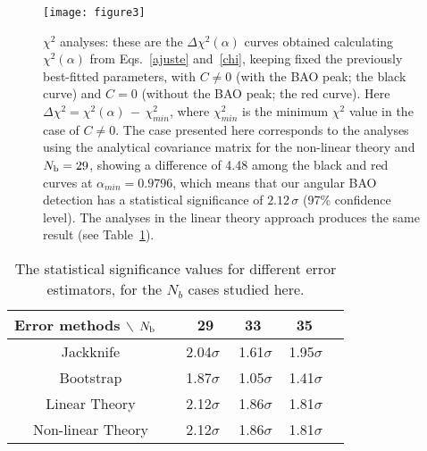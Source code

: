 \documentclass[a4paper,11pt]{article}
\begin{document}
\begin{figure*}[h!]
\centering
\texttt{[image: figure3]}
\caption{
$\chi^2$ analyses: these are the $\Delta\chi^2(\alpha)$ curves obtained calculating $\chi^2(\alpha)$ from Eqs.~\ref{ajuste} and~\ref{chi}, keeping fixed the previously best-fitted parameters, with $C \neq 0$ (with the BAO 
peak; the black curve) and $C = 0$ (without the BAO peak; the red curve).
Here $\Delta\chi^2 = \chi^2(\alpha) \,-\, \chi^2_{min}$, where $\chi^2_{min}$ is the minimum $\chi^2$ value in the case of $C \neq 0$. 
The case presented here corresponds to the analyses using the analytical covariance matrix for the non-linear theory and $N_{\mbox{\scriptsize b}} = 29$, showing a difference of 4.48 among the black and red curves at $\alpha_{min} = 0.9796$, which means that our angular BAO detection has a statistical significance of $2.12 \, \sigma$ (97\% confidence level).
The analyses in the linear theory approach produces the same result (see Table~\ref{table1}).
}
\label{fig3}
\end{figure*}

\linespread{1.25}
\begin{table}[h!]
\centering
\begin{tabular}{c|cccc}
\hline
Error methods $\backslash$ $N_{\rm b}$  \,\,&\,\, 29 & 33 & 35   \\
\hline
Jackknife         & \,\,2.04$\sigma$ & \,\,1.61$\sigma$ & \,1.95$\sigma$ \\
Bootstrap         & \,\,1.87$\sigma$ & \,\,1.05$\sigma$ & \,1.41$\sigma$ \\ 
Linear Theory     & \,\,2.12$\sigma$ & \,\,1.86$\sigma$ & \,1.81$\sigma$ \\
Non-linear Theory & \,\,2.12$\sigma$ & \,\,1.86$\sigma$ & \,1.81$\sigma$ \\
\hline
\end{tabular}
\linespread{1.0}
\caption{The statistical significance values for different error estimators, for the $N_{b}$ cases 
studied here.
}
\label{table1}
\end{table}
\end{document}
